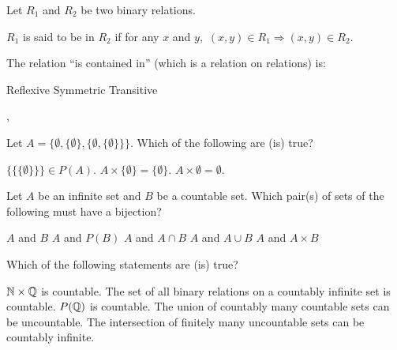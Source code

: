 \begin{questions}

\question Let $R_1$ and $R_2$ be two binary relations. 

$R_1$ is said to be  in $R_2$ if for any $x$ and $y$, $\, (x,y)\in R_1 \Rightarrow (x,y)\in R_2$. 

The relation ``is contained in'' (which is a relation on relations)
is:
\begin{choices}
\choice Reflexive
\choice Symmetric
\choice Transitive
\end{choices}
,
\vspace{1.8in}

\question Let $A = \Big\{\emptyset,\{\emptyset\},\big\{\emptyset,\{\emptyset\} \big\} \Big\}$. Which of the following are (is) true?
\begin{choices}
\choice $\Big\{\big\{\{\emptyset\}\big\}\Big\} \in P(A)$.
\choice $A \times \{\emptyset\} = \{{\emptyset}\}$.
\choice $A \times \emptyset = \emptyset$.
\end{choices}

\vspace{0.2in}


\newpage

\question Let $A$ be an infinite set and $B$ be a countable set. Which pair(s) of sets of the following must have a bijection?
\begin{choices}
\choice $A$ and $B$
\choice $A$ and $P(B)$
\choice $A$ and $A \cap B$
\choice $A$ and $A \cup B$
\choice $A$ and $A \times B$
\end{choices}

\vspace{0.2in}

\vspace{1.8in}


\question Which of the following statements are (is) true?
\begin{choices}
\choice ${\mathbb N}{}\times{\mathbb Q}{}$ is countable.
\choice The set of all binary relations on a countably infinite set is countable.
\choice $P({\mathbb Q}{})$ is countable.
\choice The union of countably many countable sets can be uncountable.
\choice The intersection of finitely many uncountable sets can be countably infinite.
\end{choices}
\end{questions}
